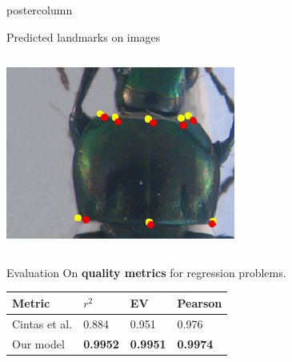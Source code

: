 \begin{frame}
\begin{columns}
\begin{column}{.49\textwidth}
\begin{beamercolorbox}[center,wd=\textwidth]{postercolumn}
\begin{minipage}[T]{.95\textwidth}
{\begin{block}{Predicted landmarks on images}
\begin{columns}
\begin{column}{.45\textwidth}
            			\includegraphics[width=.95\textwidth]{images/Prono_036.eps}
            		\end{column}
            	\end{columns}
            \end{block}
            
            \vfill
            
            \begin{block}{Evaluation}
            On \textbf{quality metrics} for regression problems. \\[0.2cm]
            \begin{center}            	
           		\begin{tabu} to 0.9\textwidth {| X[l] | X[c] | X[c] | X[c] |}
            		\hline
            		Metric\footnotemark[1] & $r^2$ & EV & Pearson \\ \hline
            		Cintas et al.\cite{cintas2016automatic} & 0.884 & 0.951 & 0.976 \\ \hline                 		    		{} Our model & \textbf{0.9952} & \textbf{0.9951} & \textbf{0.9974} \\ \hline
            	\end{tabu}            
            	
            \end{center}
            

\end{block}}
\end{minipage}
\end{beamercolorbox}
\end{column}
\end{columns}
\end{frame}
